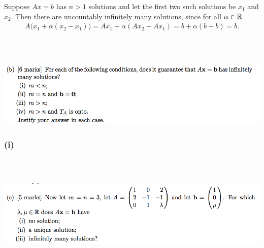\documentclass[12pt]{article}
\begin{document}
Suppose $Ax = b$ has $n > 1$ solutions and let the first two such solutions be
$x_1$ and $x_2$. Then there are uncountably infinitely many solutions, since
for all $\alpha \in \mathbb{R}$
\begin{align*}
A\Big(x_1 + \alpha (x_2 - x_1)\Big) = Ax_1 + \alpha(Ax_2 - Ax_1) = b + \alpha(b - b) = b.
\end{align*}

~\\
\subsection*{} %
\begin{mdframed}
\includegraphics[width=400pt]{img/oxford-prelims-2017-A-2-2.png}
\end{mdframed}

\subsubsection*{(i)}

~\\
\subsection*{} %
\begin{mdframed}
\includegraphics[width=400pt]{img/oxford-prelims-2017-A-2-3.png}
\end{mdframed}
\end{document}
